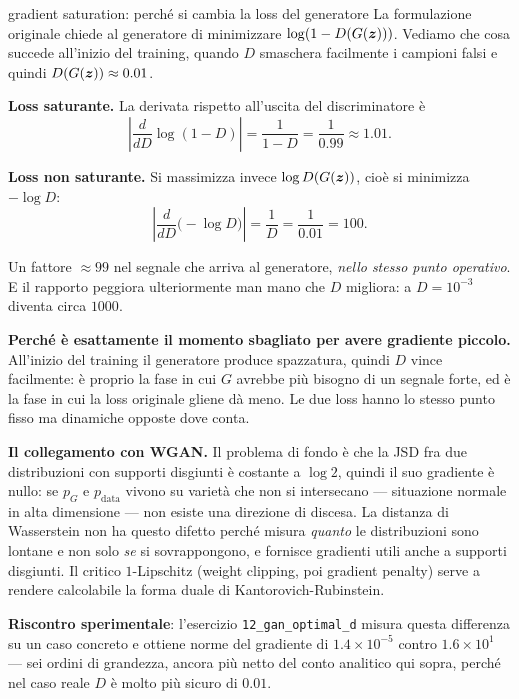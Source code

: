 \begin{esempiosvolto}{gradient saturation: perché si cambia la loss del generatore}
La formulazione originale chiede al generatore di minimizzare $\log(1 - D(G(\bm{z})))$. Vediamo che cosa succede all'inizio del training, quando $D$ smaschera facilmente i campioni falsi e quindi $D(G(\bm{z})) \approx 0.01$.

\medskip
\textbf{Loss saturante.} La derivata rispetto all'uscita del discriminatore è
\[
\left|\frac{d}{dD} \log(1 - D)\right| = \frac{1}{1 - D} = \frac{1}{0.99} \approx 1.01.
\]

\textbf{Loss non saturante.} Si massimizza invece $\log D(G(\bm{z}))$, cioè si minimizza $-\log D$:
\[
\left|\frac{d}{dD}\big(-\log D\big)\right| = \frac{1}{D} = \frac{1}{0.01} = 100.
\]

Un fattore $\approx 99$ nel segnale che arriva al generatore, \emph{nello stesso punto operativo}. E il rapporto peggiora ulteriormente man mano che $D$ migliora: a $D = 10^{-3}$ diventa circa $1000$.

\medskip
\textbf{Perché è esattamente il momento sbagliato per avere gradiente piccolo.} All'inizio del training il generatore produce spazzatura, quindi $D$ vince facilmente: è proprio la fase in cui $G$ avrebbe più bisogno di un segnale forte, ed è la fase in cui la loss originale gliene dà meno. Le due loss hanno lo stesso punto fisso ma dinamiche opposte dove conta.

\medskip
\textbf{Il collegamento con WGAN.} Il problema di fondo è che la JSD fra due distribuzioni con supporti disgiunti è costante a $\log 2$, quindi il suo gradiente è nullo: se $p_G$ e $p_{\text{data}}$ vivono su varietà che non si intersecano — situazione normale in alta dimensione — non esiste una direzione di discesa. La distanza di Wasserstein non ha questo difetto perché misura \emph{quanto} le distribuzioni sono lontane e non solo \emph{se} si sovrappongono, e fornisce gradienti utili anche a supporti disgiunti. Il critico $1$-Lipschitz (weight clipping, poi gradient penalty) serve a rendere calcolabile la forma duale di Kantorovich-Rubinstein.

\textbf{Riscontro sperimentale}: l'esercizio \texttt{12\_gan\_optimal\_d} misura questa differenza su un caso concreto e ottiene norme del gradiente di $1.4 \times 10^{-5}$ contro $1.6 \times 10^{1}$ — sei ordini di grandezza, ancora più netto del conto analitico qui sopra, perché nel caso reale $D$ è molto più sicuro di $0.01$.
\end{esempiosvolto}

